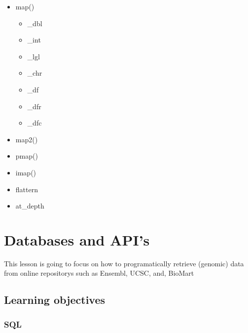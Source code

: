 \documentclass[]{book}
\providecommand{\tightlist}{%
  \setlength{\itemsep}{0pt}\setlength{\parskip}{0pt}}
\begin{document}
\begin{itemize}
\tightlist
\item
  map()

  \begin{itemize}
  \tightlist
  \item
    \_dbl
  \item
    \_int
  \item
    \_lgl
  \item
    \_chr
  \item
    \_df
  \item
    \_dfr
  \item
    \_dfc
  \end{itemize}
\item
  map2()
\item
  pmap()
\item
  imap()
\item
  flattern
\item
  at\_depth
\end{itemize}

\hypertarget{databases-and-apis}{%
\chapter{Databases and API's}\label{databases-and-apis}}

This lesson is going to focus on how to programatically retrieve
(genomic) data from online repositorys such as Ensembl, UCSC, and,
BioMart

\hypertarget{learning-objectives-2}{%
\section{Learning objectives}\label{learning-objectives-2}}

\hypertarget{sql}{%
\subsection{SQL}\label{sql}}
\end{document}
